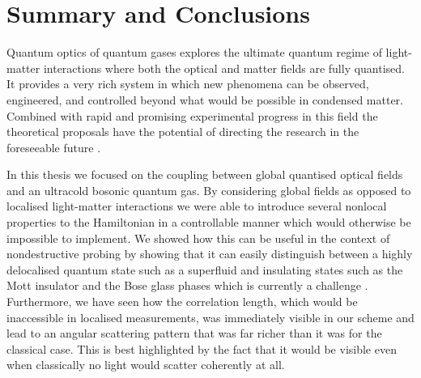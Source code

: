 
\chapter{Summary and Conclusions}  %

\ifpdf
    \graphicspath{{Chapter7/Figs/Raster/}{Chapter7/Figs/PDF/}{Chapter7/Figs/}}
\else
    \graphicspath{{Chapter7/Figs/Vector/}{Chapter7/Figs/}}
\fi

Quantum optics of quantum gases explores the ultimate quantum regime
of light-matter interactions where both the optical and matter fields
are fully quantised. It provides a very rich system in which new
phenomena can be observed, engineered, and controlled beyond what
would be possible in condensed matter. Combined with rapid and
promising experimental progress in this field the theoretical
proposals have the potential of directing the research in the
foreseeable future \cite{baumann2010, wolke2012, schmidt2014,
  klinder2015, landig2016}.

In this thesis we focused on the coupling between global quantised
optical fields and an ultracold bosonic quantum gas. By considering
global fields as opposed to localised light-matter interactions we
were able to introduce several nonlocal properties to the Hamiltonian
in a controllable manner which would otherwise be impossible to
implement. We showed how this can be useful in the context of
nondestructive probing by showing that it can easily distinguish
between a highly delocalised quantum state such as a superfluid and
insulating states such as the Mott insulator and the Bose glass phases
which is currently a challenge \cite{derrico2014}. Furthermore, we
have seen how the correlation length, which would be inaccessible in
localised measurements, was immediately visible in our scheme and lead
to an angular scattering pattern that was far richer than it was for
the classical case. This is best highlighted by the fact that it would
be visible even when classically no light would scatter coherently at
all.

